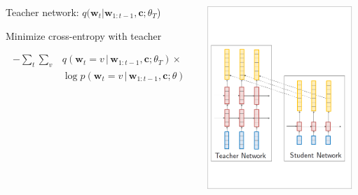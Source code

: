 \documentclass{beamer}
\newcommand{\air}{\vspace{0.25cm}}
\newcommand{\given}{\,|\,}
\newcommand{\wvec}{\mathbf{w}}
\newcommand{\cvec}{\mathbf{c}}
\begin{document}
\begin{frame}


\centerline{}
\air 
\begin{columns}
\begin{column}{6.5cm}

Teacher network: $q(\wvec_{t} | \wvec_{1:t-1}, \cvec  ; \theta_T$)  
\air 

Minimize cross-entropy with teacher %

\begin{align*}
-\sum_t \sum_v &q(\wvec_t=v \given \wvec_{1: t-1}, \cvec ; \theta_T)\times \\
& \log p(\wvec_t =v \given \wvec_{1: t-1}, \cvec ; \theta)
\end{align*}
\end{column}

\begin{column}{5.5cm}
\includegraphics[width=5.5cm]{word-kd-2}
\end{column}
\end{columns}
\end{frame}

\end{document}
